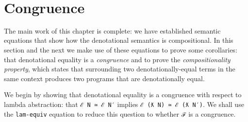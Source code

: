 \begin{fence}
\begin{code}%
\>[0]\AgdaSpace{}%
\AgdaSymbol{:}\AgdaSpace{}%
\AgdaSymbol{\}\{}\AgdaSpace{}%
\AgdaSymbol{:}\AgdaSpace{}%
\AgdaSpace{}%
\AgdaSpace{}%
\AgdaSymbol{\}}\AgdaSpace{}%
\AgdaSpace{}%
\AgdaSpace{}%
\AgdaSymbol{(}\AgdaSpace{}%
\AgdaSymbol{)}\AgdaSpace{}%
\AgdaSpace{}%
\AgdaSpace{}%
\AgdaSpace{}%
\AgdaSpace{}%
\AgdaSpace{}%
\AgdaSpace{}%
\AgdaSpace{}%
\AgdaSpace{}%
\AgdaSymbol{)}\<%
\\
\>[0]\AgdaSpace{}%
\AgdaSpace{}%
\AgdaSpace{}%
\AgdaSymbol{=}\AgdaSpace{}%
\AgdaSpace{}%
\AgdaSpace{}%
\AgdaOperator{\AgdaInductiveConstructor{,}}\AgdaSpace{}%
\AgdaSpace{}%
\AgdaSpace{}%
\AgdaSpace{}%
\AgdaSpace{}%
\AgdaSpace{}%
\AgdaSymbol{)}\AgdaSpace{}%
\<%
\end{code}
\end{fence}

\hypertarget{congruence}{%
\section{Congruence}\label{congruence}}

The main work of this chapter is complete: we have established semantic
equations that show how the denotational semantics is compositional. In
this section and the next we make use of these equations to prove some
corollaries: that denotational equality is a \emph{congruence} and to
prove the \emph{compositionality property}, which states that
surrounding two denotationally-equal terms in the same context produces
two programs that are denotationally equal.

We begin by showing that denotational equality is a congruence with
respect to lambda abstraction: that \texttt{ℰ\ N\ ≃\ ℰ\ N′} implies
\texttt{ℰ\ (ƛ\ N)\ ≃\ ℰ\ (ƛ\ N′)}. We shall use the \texttt{lam-equiv}
equation to reduce this question to whether \texttt{ℱ} is a congruence.

